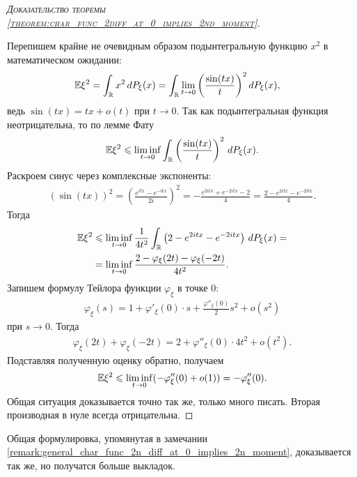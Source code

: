 \documentclass[../main.tex]{subfiles}
\begin{document}
\begin{proof}[\normalfont\textsc{Доказательство теоремы \ref{theorem:char_func_2diff_at_0_implies_2nd_moment}}]\

 Перепишем крайне не очевидным образом подынтегральную функцию $ x^{2} $ в математическом ожидании:
 \begin{align*}
  \mathbb E\xi^{2} &= \int_{\mathbb{R}} x^{2}\,dP_\xi(x) = \int_{\mathbb{R}} \lim_{t \to 0} \left(\frac{\sin(tx)}{t} \right)  ^{2}dP_\xi(x),
 \end{align*} ведь $ \sin(tx) = tx + o(t) $ при $ t \to 0 $. Так как подынтегральная функция неотрицательна, то по лемме Фату
 \begin{align*}
  \mathbb E\xi^{2} \leqslant \liminf_{t \to 0} \int_{\mathbb{R}} \left( \frac{\sin(tx)}{t} \right)^{2}\,dP_\xi(x).
 \end{align*} Раскроем синус через комплексные экспоненты:
 \begin{align*}
  (\sin(tx))^{2} = \left( \frac{e^{itx} - e^{-itx}}{2i} \right)^{2} = -\frac{e^{2itx} + e^{-2itx}-2}{4} = \frac{2-e^{2itx}-e^{-2itx}}{4}.
 \end{align*} Тогда
 \begin{align*}
  \mathbb E\xi^{2} &\leqslant \liminf_{t \to 0} \frac{1}{4t^{2}} \int_{\mathbb{R}} \left( 2-e^{2itx} -e^{-2itx} \right) \,dP_\xi(x) = \\
  &=\liminf_{ t\to 0} \frac{2  - \varphi_\xi(2t) - \varphi_\xi(-2t)}{4t^{2}}.
 \end{align*} Запишем формулу Тейлора функции $ \varphi_\xi $ в точке $ 0 $:
 \begin{align*}
  \varphi_\xi(s) = 1 + \varphi'_\xi(0) \cdot s + \frac{\varphi''_\xi(0)}{2}s^{2} + o(s^{2})
 \end{align*} при $ s \to 0 $. Тогда
 \begin{align*}
  \varphi_\xi(2t) + \varphi_\xi(-2t) = 2 + \varphi''_\xi(0) \cdot 4t^{2} + o(t^{2}).
 \end{align*} Подставляя полученную оценку обратно, получаем
 \begin{align*}
  \mathbb E\xi^{2} \leqslant \liminf_{t \to 0} (-\varphi_\xi''(0) + o(1)) = -\varphi_\xi''(0).
 \end{align*}
 Общая ситуация доказывается точно так же, только много писать. Вторая производная в нуле всегда отрицательна.
\end{proof}

Общая формулировка, упомянутая в замечании \ref{remark:general_char_func_2n_diff_at_0_implies_2n_moment}, доказывается так же, но получатся больше выкладок. 
\end{document}
